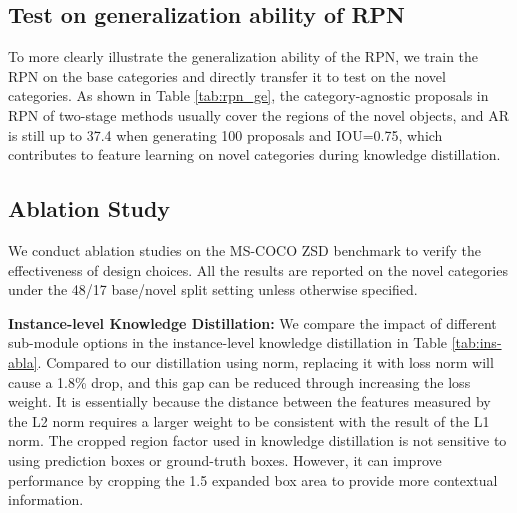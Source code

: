 \documentclass[10pt,twocolumn,letterpaper]{article}
\begin{document}
\subsection{Test on generalization ability of RPN}
\label{sec:rpn}
To more clearly illustrate the generalization ability of the RPN, we train the RPN on the base categories and directly transfer it to test on the novel categories.
As shown in Table \ref{tab:rpn_ge}, the category-agnostic proposals in RPN of two-stage methods usually cover the regions of the novel objects, and AR is still up to 37.4 when generating 100 proposals and IOU=0.75, which contributes to feature learning on novel categories during knowledge distillation.

\subsection{Ablation Study}
We conduct ablation studies on the MS-COCO ZSD benchmark to verify the effectiveness of design choices. 
All the results are reported on the novel categories under the 48/17 base/novel split setting unless otherwise specified.


\noindent \textbf{Instance-level Knowledge Distillation:} We compare the impact of different sub-module options in the instance-level knowledge distillation in Table \ref{tab:ins-abla}. Compared to our distillation using  norm, replacing it with  loss norm will cause a 1.8\%  drop, and this gap can be reduced through increasing the loss weight. It is essentially because the distance between the features measured by the L2 norm requires a larger weight to be consistent with the result of the L1 norm. The cropped region factor used in knowledge distillation is not sensitive to using prediction boxes or ground-truth boxes. However, it can improve performance by cropping the 1.5 expanded box area to provide more contextual information. 
\end{document}
